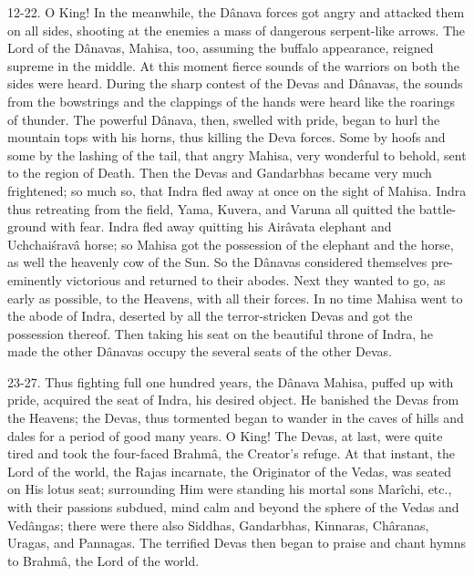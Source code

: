 12-22. O King! In the meanwhile, the D\^anava forces got angry and attacked them on all sides, shooting at the enemies a mass of dangerous serpent-like arrows. The Lord of the D\^anavas, Mahisa, too, assuming the buffalo appearance, reigned supreme in the middle. At this moment fierce sounds of the warriors on both the sides were heard. During the sharp contest of the Devas and D\^anavas, the sounds from the bowstrings and the clappings of the hands were heard like the roarings of thunder. The powerful D\^anava, then, swelled with pride, began to hurl the mountain tops with his horns, thus killing the Deva forces. Some by hoofs and some by the lashing of the tail, that angry Mahisa, very wonderful to behold, sent to the region of Death. Then the Devas and Gandarbhas became very much frightened; so much so, that Indra fled away at once on the sight of Mahisa. Indra thus retreating from the field, Yama, Kuvera, and Varuna all quitted the battle-ground with fear. Indra fled away quitting his Air\^avata elephant and Uchchai\'srav\^a horse; so Mahisa got the possession of the elephant and the horse, as well the heavenly cow of the Sun. So the D\^anavas considered themselves pre-eminently victorious and returned to their abodes. Next they wanted to go, as early as possible, to the Heavens, with all their forces. In no time Mahisa went to the abode of Indra, deserted by all the terror-stricken Devas and got the possession thereof. Then taking his seat on the beautiful throne of Indra, he made the other D\^anavas occupy the several seats of the other Devas.

23-27. Thus fighting full one hundred years, the D\^anava Mahisa, puffed up with pride, acquired the seat of Indra, his desired object. He banished the Devas from the Heavens; the Devas, thus tormented began to wander in the caves of hills and dales for a period of good many years. O King! The Devas, at last, were quite tired and took the four-faced Brahm\^a, the Creator's refuge. At that instant, the Lord of the world, the Rajas incarnate, the Originator of the Vedas, was seated on His lotus seat; surrounding Him were standing his mortal sons Mar\^ichi, etc., with their passions subdued, mind calm and beyond the sphere of the Vedas and Ved\^angas; there were there also Siddhas, Gandarbhas, Kinnaras, Ch\^aranas, Uragas, and Pannagas. The terrified Devas then began to praise and chant hymns to Brahm\^a, the Lord of the world.

